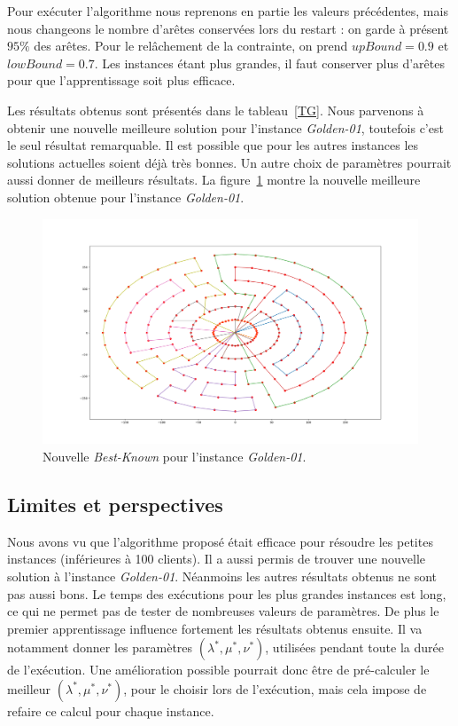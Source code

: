 \documentclass[a4paper,11pt]{article}%
\begin{document}
Pour exécuter l'algorithme nous reprenons en partie les valeurs précédentes, mais nous changeons le nombre d'arêtes conservées lors du restart : on garde à présent $95\%$ des arêtes. Pour le relâchement de la contrainte, on prend $upBound = 0.9$ et $lowBound = 0.7$. Les instances étant plus grandes, il faut conserver plus d'arêtes pour que l'apprentissage soit plus efficace.

Les résultats obtenus sont présentés dans le tableau~\ref{TG}. Nous parvenons à obtenir une nouvelle meilleure solution pour l'instance \emph{Golden-01}, toutefois c'est le seul résultat remarquable. Il est possible que pour les autres instances les solutions actuelles soient déjà très bonnes. Un autre choix de paramètres pourrait aussi donner de meilleurs résultats. La figure~\ref{NewBest} montre la nouvelle meilleure solution obtenue pour l'instance \emph{Golden-01}. 

\begin{figure}[p]
\begin{center}

\includegraphics[scale=0.32]{NewBest5499}
\caption{Nouvelle \emph{Best-Known} pour l'instance \emph{Golden-01}.}

\label{NewBest}


\end{center}
\end{figure}

\subsection{Limites et perspectives}

Nous avons vu que l'algorithme proposé était efficace pour résoudre les petites instances (inférieures à 100 clients). 
Il a aussi permis de trouver une nouvelle solution à l'instance \emph{Golden-01}. 
Néanmoins les autres résultats obtenus ne sont pas aussi bons. 
Le temps des exécutions pour les plus grandes instances est long, ce qui ne permet pas de tester de nombreuses valeurs de paramètres.
De plus le premier apprentissage influence fortement les résultats obtenus ensuite. Il va notamment donner les paramètres $(\lambda^*,\mu^*,\nu^*)$, utilisées pendant toute la durée de l'exécution. Une amélioration possible pourrait donc être de pré-calculer le meilleur  
$(\lambda^*,\mu^*,\nu^*)$, pour le choisir lors de l'exécution, mais cela impose de refaire ce calcul pour chaque instance.
\end{document}

